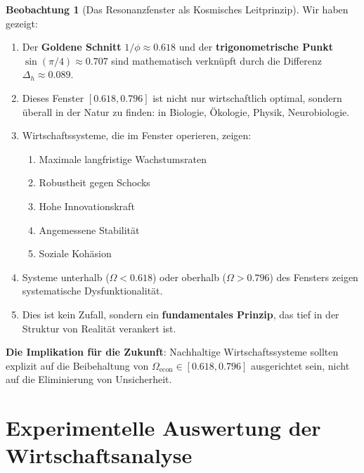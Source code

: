 \documentclass[a4paper, 12pt, twoside, openright]{report}
\theoremstyle{definition}
\newtheorem{beobachtung}{Beobachtung}
\theoremstyle{definition}
\begin{document}
\begin{beobachtung}[Das Resonanzfenster als Kosmisches Leitprinzip]

Wir haben gezeigt:

\begin{enumerate}
	\item Der \textbf{Goldene Schnitt} $1/\phi \approx 0.618$ und der \textbf{trigonometrische Punkt} $\sin(\pi/4) \approx 0.707$ sind mathematisch verknüpft durch die Differenz $\Delta_h \approx 0.089$.
	
	\item Dieses Fenster $[0.618, 0.796]$ ist nicht nur wirtschaftlich optimal, sondern überall in der Natur zu finden: in Biologie, Ökologie, Physik, Neurobiologie.
	
	\item Wirtschaftssysteme, die im Fenster operieren, zeigen:
	\begin{enumerate}
		\item Maximale langfristige Wachstumsraten
		\item Robustheit gegen Schocks
		\item Hohe Innovationskraft
		\item Angemessene Stabilität
		\item Soziale Kohäsion
	\end{enumerate}
	
	\item Systeme unterhalb ($\Omega < 0.618$) oder oberhalb ($\Omega > 0.796$) des Fensters zeigen systematische Dysfunktionalität.
	
	\item Dies ist kein Zufall, sondern ein \textbf{fundamentales Prinzip}, das tief in der Struktur von Realität verankert ist.
\end{enumerate}

\textbf{Die Implikation für die Zukunft}: Nachhaltige Wirtschaftssysteme sollten explizit auf die Beibehaltung von $\Omega_{\text{econ}} \in [0.618, 0.796]$ ausgerichtet sein, nicht auf die Eliminierung von Unsicherheit.

\end{beobachtung}

\cleardoublepage

\chapter{Experimentelle Auswertung der Wirtschaftsanalyse}
\label{chap:experimentauswertung}
\end{document}
